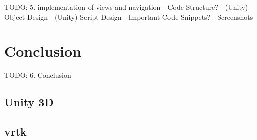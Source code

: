 TODO:
5. implementation of views and navigation
- Code Structure?
- (Unity) Object Design
- (Unity) Script Design
- Important Code Snippets?
- Screenshots







\section{Conclusion}


TODO:
6. Conclusion


\subsection{Unity 3D}


\subsection{\gls{vrtk}}




